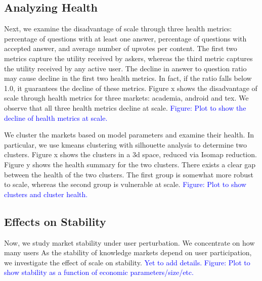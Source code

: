 \subsection{Analyzing Health}
Next, we examine the disadvantage of scale through three health metrics: percentage of questions with at least one answer, percentage of questions with accepted answer, and average number of upvotes per content. The first two metrics capture the utility received by askers, whereas the third metric captures the utility received by any active user. The decline in answer to question ratio may cause decline in the first two health metrics. In fact, if the ratio falls below 1.0, it guarantees the decline of these metrics. Figure x shows the disadvantage of scale through health metrics for three markets: academia, android and tex. We observe that all three health metrics decline at scale. \textcolor{blue}{Figure: Plot to show the decline of health metrics at scale.}

We cluster the markets based on model parameters and examine their health. In particular, we use kmeans clustering with silhouette analysis to determine two clusters. Figure x shows the clusters in a 3d space, reduced via Isomap reduction. Figure y shows the health summary for the two clusters. There exists a clear gap between the health of the two clusters. The first group is somewhat more robust to scale, whereas the second group is vulnerable at scale. \textcolor{blue}{Figure: Plot to show clusters and cluster health.}

\subsection{Effects on Stability}
Now, we study market stability under user perturbation. We concentrate on how many users
As the stability of knowledge markets depend on user participation, we investigate the effect of scale on stability. \textcolor{blue}{Yet to add details. Figure: Plot to show stability as a function of economic parameters/size/etc.}


